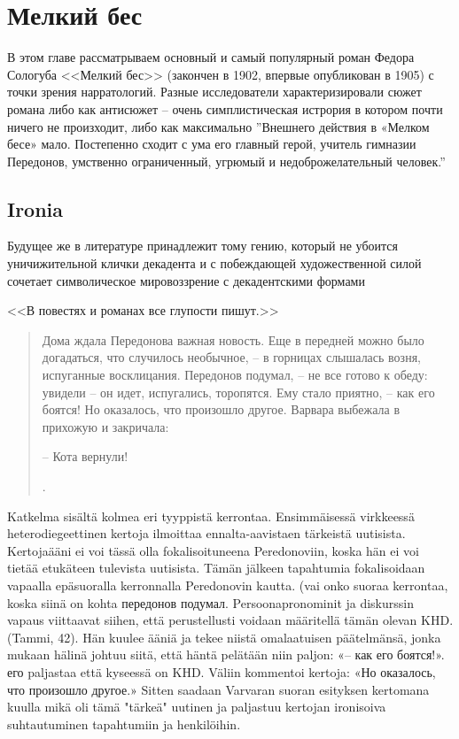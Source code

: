 \documentclass[12pt,a4paper]{article}
\begin{document}
\section{Мелкий бес}

В этом главе рассматрываем основный и самый популярный роман Федора Сологуба <<Мелкий бес>> (закончен в 1902, впервые опубликован в 1905) с точки зрения нарратологий. Разные исследователи характеризировали сюжет романа либо как антисюжет -- очень симплистическая истрория в котором почти ничего не произходит, либо как максимально  
''Внешнего действия в «Мелком бесе» мало. Постепенно сходит с ума его главный герой, учитель гимназии Передонов, умственно ограниченный, угрюмый и недоброжелательный человек.''
\autocite[432.]{grigorjev1983}


\subsection{Ironia}

Будущее же в литературе принадлежит тому гению, который не убоится уничижительной клички декадента и с побеждающей художественной силой сочетает символическое мировоззрение с декадентскими формами

<<В повестях и романах все глупости пишут.>>\parencite[54]{sologub2004}



\begin{quote}
Дома ждала Передонова важная новость. Еще в передней можно
было догадаться, что случилось необычное, – в горницах слышалась 
возня, испуганные восклицания. Передонов подумал, – не все
готово к обеду: увидели – он идет, испугались, торопятся. Ему стало
приятно, – как его боятся! Но оказалось, что произошло другое. 
Варвара выбежала в прихожую и закричала:

– Кота вернули!

\parencite[171]{sologub2004}.

\end{quote}

Katkelma sisältä kolmea eri tyyppistä kerrontaa. Ensimmäisessä virkkeessä
heterodiegeettinen kertoja ilmoittaa ennalta-aavistaen tärkeistä uutisista.
Kertojaääni ei voi tässä olla fokalisoituneena Peredonoviin, koska
hän ei voi tietää etukäteen tulevista uutisista. Tämän jälkeen tapahtumia
fokalisoidaan vapaalla epäsuoralla kerronnalla Peredonovin kautta. (vai onko suoraa
kerrontaa, koska siinä on kohta передонов подумал. Persoonapronominit ja diskurssin vapaus viittaavat siihen, että perustellusti voidaan määritellä tämän olevan KHD.
(Tammi, 42). Hän
kuulee ääniä ja tekee niistä omalaatuisen päätelmänsä, jonka mukaan hälinä
johtuu siitä, että häntä pelätään niin paljon: «– как его боятся!». его paljastaa
että kyseessä on KHD. Väliin
kommentoi kertoja: «Но оказалось, что произошло другое.» Sitten saadaan
Varvaran suoran esityksen kertomana kuulla mikä oli tämä "tärkeä" uutinen ja
paljastuu kertojan ironisoiva suhtautuminen tapahtumiin ja henkilöihin. \autocite[vrt.][230.]{hutchings1997}
\end{document}
